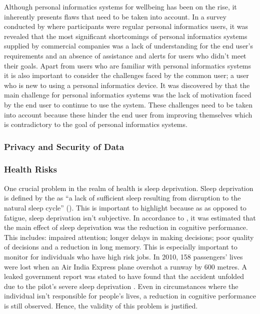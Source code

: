 Although personal informatics systems for wellbeing has been on the rise, it inherently presents
flaws that need to be taken into account. In a survey conducted by \textcite{Rapp:2014aa} where
participants were regular personal informatics users, it was revealed that the most significant
shortcomings of personal informatics systems supplied by commercial companies was a lack of
understanding for the end user's requirements and an absence of assistance and alerts for users who
didn't meet their goals. Apart from users who are familiar with personal informatics systems it is
also important to consider the challenges faced by the common user; a user who is new to using a
personal informatics device. It was discovered by \textcite{Rapp:2014aa} that the main challenge for
personal informatics systems was the lack of motivation faced by the end user to continue to use the
system. These challenges need to be taken into account because these hinder the end user from
improving themselves which is contradictory to the goal of personal informatics systems.

\subsubsection{Privacy and Security of Data}



\subsubsection{Health Risks}

One crucial problem in the realm of health is sleep deprivation. Sleep deprivation is defined by the
\citeauthor{British-Medical-Association:2018aa} as ``a lack of sufficient sleep resulting from
disruption to the natural sleep cycle'' (\citeyear{British-Medical-Association:2018aa}). This is
important to highlight because as as opposed to fatigue, sleep deprivation isn't subjective. In
accordance to \textcite{Alhola:2007aa}, it was estimated that the main effect of sleep deprivation
was the reduction in cognitive performance. This includes: impaired attention; longer delays in
making decisions; poor quality of decisions and a reduction in long memory. This is especially
important to monitor for individuals who have high risk jobs. In 2010, 158 passengers' lives were
lost when an Air India Express plane overshot a runway by 600 metres. A leaked government report was
stated to have found that the accident unfolded due to the pilot's severe sleep deprivation
\parencite{British-Broadcasting-Corporation:2010aa}. Even in circumstances where the individual
isn't responsible for people's lives, a reduction in cognitive performance is still observed. Hence,
the validity of this problem is justified.

